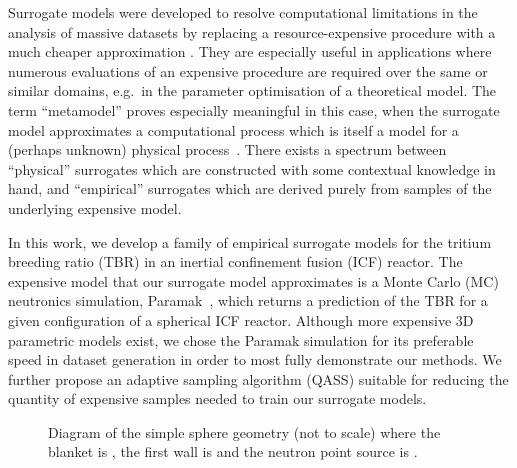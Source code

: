 Surrogate models were developed to resolve computational limitations in the analysis of massive datasets by replacing a resource-expensive procedure with a much cheaper approximation
\cite{Sondergaard2003}. They are especially useful in applications where
numerous evaluations of an expensive procedure are required over the same or
similar domains, e.g.~in the parameter optimisation of a theoretical model. The
term ``metamodel'' proves especially meaningful in this case, when the surrogate
model approximates a computational process which is itself a model for a
(perhaps unknown) physical process~\cite{Myers2002}. There exists a spectrum
between ``physical'' surrogates which are constructed with some contextual
knowledge in hand, and ``empirical'' surrogates which are derived purely from
samples of the underlying expensive model.

In this work, we develop a family of empirical surrogate models for the tritium breeding
ratio (TBR) in an inertial confinement fusion (ICF) reactor. The expensive model
that our surrogate model approximates is a Monte Carlo (MC) neutronics
simulation, Paramak~\cite{paramak}, which returns a prediction of the TBR for a given
configuration of a spherical ICF reactor. Although more expensive 3D parametric models exist, we chose the Paramak simulation for its preferable speed in dataset generation in order to most fully demonstrate our methods. We further propose an adaptive sampling algorithm (QASS) suitable for reducing the quantity of expensive samples needed to train our surrogate models.

\begin{figure}[!ht]
  \centering

    \caption{Diagram of the simple sphere geometry (not to scale) where the blanket is , the first wall is  and the neutron point source is .}
    \label{fig:model_diagram}
\end{figure}

